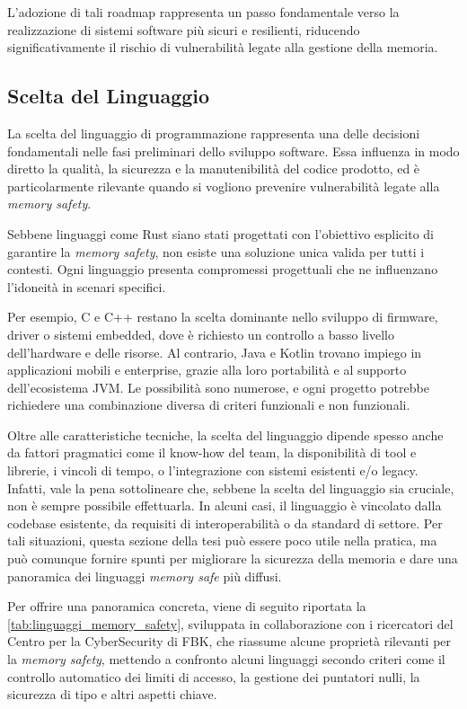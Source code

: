 L'adozione di tali roadmap rappresenta un passo fondamentale verso la realizzazione
di sistemi software più sicuri e resilienti, riducendo significativamente il
rischio di vulnerabilità legate alla gestione della memoria.

\subsection{Scelta del Linguaggio}
\label{sec:linguaggio}

La scelta del linguaggio di programmazione rappresenta una delle decisioni fondamentali
nelle fasi preliminari dello sviluppo software. Essa influenza in modo diretto
la qualità, la sicurezza e la manutenibilità del codice prodotto, ed è
particolarmente rilevante quando si vogliono prevenire vulnerabilità legate alla
\textit{memory safety}.

Sebbene linguaggi come Rust siano stati progettati con l'obiettivo esplicito di garantire
la \textit{memory safety}, non esiste una soluzione unica valida per tutti i contesti.
Ogni linguaggio presenta compromessi progettuali che ne influenzano l'idoneità
in scenari specifici.

Per esempio, C e C++ restano la scelta dominante nello sviluppo di firmware,
driver o sistemi embedded, dove è richiesto un controllo a basso livello dell'hardware
e delle risorse. Al contrario, Java e Kotlin trovano impiego in applicazioni mobili
e enterprise, grazie alla loro portabilità e al supporto dell'ecosistema JVM. Le
possibilità sono numerose, e ogni progetto potrebbe richiedere una combinazione
diversa di criteri funzionali e non funzionali.

Oltre alle caratteristiche tecniche, la scelta del linguaggio dipende spesso anche
da fattori pragmatici come il know-how del team, la disponibilità di tool e
librerie, i vincoli di tempo, o l'integrazione con sistemi esistenti e/o legacy.
Infatti, vale la pena sottolineare che, sebbene la scelta del linguaggio sia cruciale,
non è sempre possibile effettuarla. In alcuni casi, il linguaggio è vincolato
dalla codebase esistente, da requisiti di interoperabilità o da standard di settore.
Per tali situazioni, questa sezione della tesi può essere poco utile nella pratica,
ma può comunque fornire spunti per migliorare la sicurezza della memoria e dare
una panoramica dei linguaggi \textit{memory safe} più diffusi.

Per offrire una panoramica concreta, viene di seguito riportata la
\autoref{tab:linguaggi_memory_safety}, sviluppata in collaborazione con i ricercatori
del Centro per la CyberSecurity di FBK, che riassume alcune proprietà rilevanti
per la \textit{memory safety}, mettendo a confronto alcuni linguaggi secondo
criteri come il controllo automatico dei limiti di accesso, la gestione dei puntatori
nulli, la sicurezza di tipo e altri aspetti chiave.

